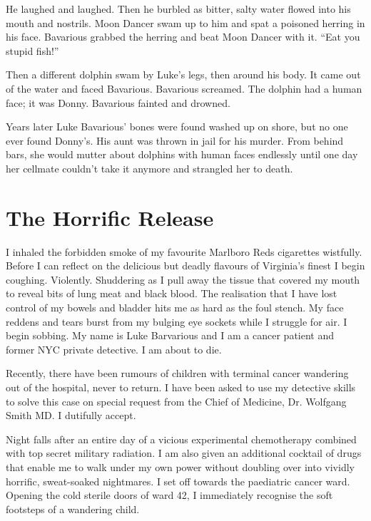 He laughed and laughed. Then he burbled as bitter, salty water
flowed into his mouth and nostrils. Moon Dancer swam up to him and
spat a poisoned herring in his face. Bavarious grabbed the herring
and beat Moon Dancer with it. ``Eat you stupid fish!''



Then a different dolphin swam by Luke's legs, then around his body.
It came out of the water and faced Bavarious. Bavarious screamed.
The dolphin had a human face; it was Donny. Bavarious fainted and
drowned.



Years later Luke Bavarious' bones were found washed up on shore,
but no one ever found Donny's. His aunt was thrown in jail for his
murder. From behind bars, she would mutter about dolphins with
human faces endlessly until one day her cellmate couldn't take it
anymore and strangled her to death. 
 



\chapter{The Horrific Release}





I inhaled the forbidden smoke of my favourite Marlboro Reds
cigarettes wistfully. Before I can reflect on the delicious but
deadly flavours of Virginia's finest I begin coughing. Violently.
Shuddering as I pull away the tissue that covered my mouth to
reveal bits of lung meat and black blood. The realisation that I
have lost control of my bowels and bladder hits me as hard as the
foul stench. My face reddens and tears burst from my bulging eye
sockets while I struggle for air. I begin sobbing. My name is Luke
Barvarious and I am a cancer patient and former NYC private
detective. I am about to die.

Recently, there have been rumours of children with terminal cancer
wandering out of the hospital, never to return. I have been asked
to use my detective skills to solve this case on special request
from the Chief of Medicine, Dr. Wolfgang Smith MD. I dutifully
accept.

Night falls after an entire day of a vicious experimental
chemotherapy combined with top secret military radiation. I am also
given an additional cocktail of drugs that enable me to walk under
my own power without doubling over into vividly horrific,
sweat-soaked nightmares. I set off towards the paediatric cancer
ward. Opening the cold sterile doors of ward 42, I immediately
recognise the soft footsteps of a wandering child.

